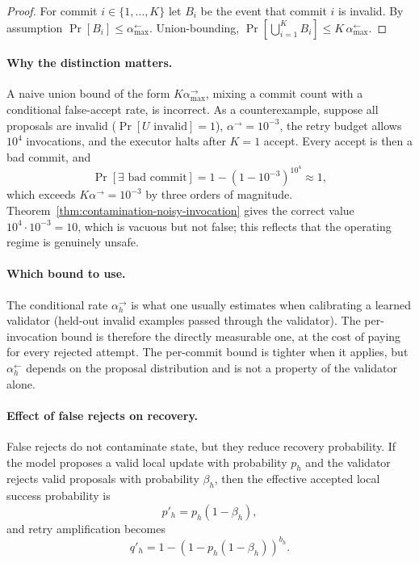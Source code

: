 \documentclass[11pt]{article}
\begin{document}
\begin{proof}
For commit $i\in\{1,\dots,K\}$ let $B_i$ be the event that commit $i$ is
invalid. By assumption $\Pr[B_i]\le\alpha_{\max}^{\leftarrow}$. Union-bounding,
$\Pr[\bigcup_{i=1}^{K}B_i]\le K\,\alpha_{\max}^{\leftarrow}$.
\end{proof}

\paragraph{Why the distinction matters.}
A naive union bound of the form $K\alpha_{\max}^{\rightarrow}$, mixing a commit
count with a conditional false-accept rate, is incorrect. As a counterexample,
suppose all proposals are invalid ($\Pr[U \text{ invalid}]=1$),
$\alpha^{\rightarrow}=10^{-3}$, the retry budget allows $10^4$ invocations,
and the executor halts after $K=1$ accept. Every accept is then a bad commit,
and
\[
\Pr[\exists \text{ bad commit}]
=1-(1-10^{-3})^{10^4}\approx 1,
\]
which exceeds $K\alpha^{\rightarrow}=10^{-3}$ by three orders of magnitude.
Theorem~\ref{thm:contamination-noisy-invocation} gives the correct value
$10^4\cdot 10^{-3}=10$, which is vacuous but not false; this reflects that the
operating regime is genuinely unsafe.

\paragraph{Which bound to use.}
The conditional rate $\alpha_h^{\rightarrow}$ is what one usually estimates
when calibrating a learned validator (held-out invalid examples passed through
the validator). The per-invocation bound is therefore the directly measurable
one, at the cost of paying for every rejected attempt. The per-commit bound is
tighter when it applies, but $\alpha_h^{\leftarrow}$ depends on the proposal
distribution and is not a property of the validator alone.

\paragraph{Effect of false rejects on recovery.}
False rejects do not contaminate state, but they reduce recovery probability.
If the model proposes a valid local update with probability $p_h$ and the
validator rejects valid proposals with probability $\beta_h$, then the
effective accepted local success probability is
\[
p'_h = p_h(1-\beta_h),
\]
and retry amplification becomes
\[
q'_h = 1-(1-p_h(1-\beta_h))^{b_h}.
\]
\end{document}
